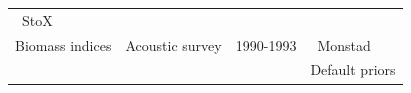 \documentclass[
]{article}
\begin{document}
\begin{longtable}[]{@{}llll@{}}
\begin{minipage}[t]{0.33\columnwidth}
~StoX\strut
\end{minipage}\tabularnewline
\begin{minipage}[t]{0.21\columnwidth}\raggedright
Biomass indices\strut
\end{minipage} & \begin{minipage}[t]{0.20\columnwidth}\raggedright
Acoustic survey\strut
\end{minipage} & \begin{minipage}[t]{0.15\columnwidth}\raggedright
1990-1993\strut
\end{minipage} & \begin{minipage}[t]{0.33\columnwidth}\raggedright
~Monstad\strut
\end{minipage}\tabularnewline
\begin{minipage}[t]{0.21\columnwidth}\raggedright
\strut
\end{minipage} & \begin{minipage}[t]{0.20\columnwidth}\raggedright
\strut
\end{minipage} & \begin{minipage}[t]{0.15\columnwidth}\raggedright
\strut
\end{minipage} & \begin{minipage}[t]{0.33\columnwidth}\raggedright
Default priors\strut
\end{minipage}\tabularnewline
\bottomrule
\end{longtable}
\end{document}
